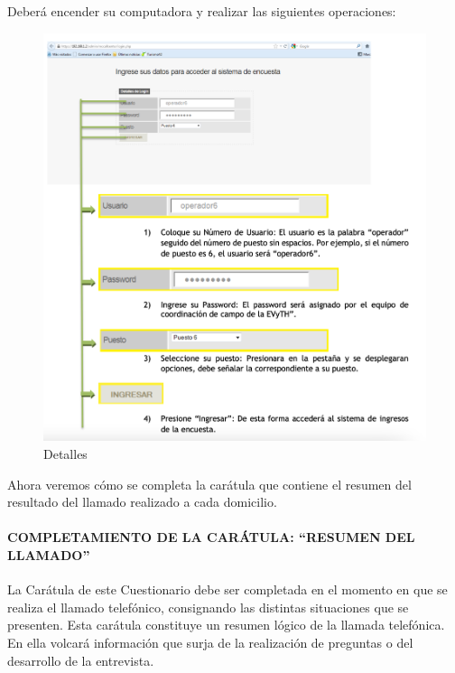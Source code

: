 \documentclass[
  openany]{book}
\begin{document}
Deberá encender su computadora y realizar las siguientes operaciones:

\begin{figure}

{\centering \includegraphics[width=1\linewidth]{imagenes/figura6-23} 

}

\caption{Detalles}\label{fig:detal}
\end{figure}

Ahora veremos cómo se completa la carátula que contiene el resumen del resultado del llamado realizado a cada domicilio.

\hypertarget{completamiento-de-la-caruxe1tula-resumen-del-llamado}{%
\paragraph{\texorpdfstring{\textbf{COMPLETAMIENTO DE LA CARÁTULA: ``RESUMEN DEL LLAMADO''}}{COMPLETAMIENTO DE LA CARÁTULA: ``RESUMEN DEL LLAMADO''}}\label{completamiento-de-la-caruxe1tula-resumen-del-llamado}}

La Carátula de este Cuestionario debe ser completada en el momento en que se realiza el llamado telefónico, consignando las distintas situaciones que se presenten. Esta carátula constituye un resumen lógico de la llamada telefónica. En ella volcará información que surja de la realización de preguntas o del desarrollo de la entrevista.
\end{document}
